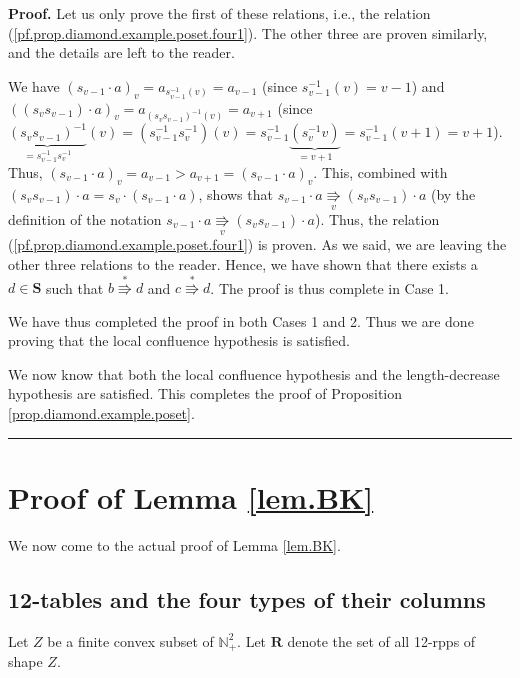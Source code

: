 \documentclass[numbers=enddot,12pt,final,onecolumn,notitlepage]{scrartcl}%
\theoremstyle{definition}
\newenvironment{proof}[1][Proof]{\noindent\textbf{#1.} }{\ \rule{0.5em}{0.5em}}
\begin{document}
\begin{proof}
Let us only prove the first of these relations, i.e., the relation
(\ref{pf.prop.diamond.example.poset.four1}). The other three are proven
similarly, and the details are left to the reader.

We have $\left(  s_{v-1}\cdot a\right)  _{v}=a_{s_{v-1}^{-1}\left(  v\right)
}=a_{v-1}$ (since $s_{v-1}^{-1}\left(  v\right)  =v-1$) and $\left(  \left(
s_{v}s_{v-1}\right)  \cdot a\right)  _{v}=a_{\left(  s_{v}s_{v-1}\right)
^{-1}\left(  v\right)  }=a_{v+1}$ (since $\underbrace{\left(  s_{v}%
s_{v-1}\right)  ^{-1}}_{=s_{v-1}^{-1}s_{v}^{-1}}\left(  v\right)  =\left(
s_{v-1}^{-1}s_{v}^{-1}\right)  \left(  v\right)  =s_{v-1}^{-1}%
\underbrace{\left(  s_{v}^{-1}v\right)  }_{=v+1}=s_{v-1}^{-1}\left(
v+1\right)  =v+1$). Thus, $\left(  s_{v-1}\cdot a\right)  _{v}=a_{v-1}%
>a_{v+1}=\left(  s_{v-1}\cdot a\right)  _{v}$. This, combined with $\left(
s_{v}s_{v-1}\right)  \cdot a=s_{v}\cdot\left(  s_{v-1}\cdot a\right)  $, shows
that $s_{v-1}\cdot a\underset{v}{\Rrightarrow}\left(  s_{v}s_{v-1}\right)
\cdot a$ (by the definition of the notation $s_{v-1}\cdot
a\underset{v}{\Rrightarrow}\left(  s_{v}s_{v-1}\right)  \cdot a$). Thus, the
relation (\ref{pf.prop.diamond.example.poset.four1}) is proven. As we said, we
are leaving the other three relations to the reader. Hence, we have shown that
there exists a $d\in\mathbf{S}$ such that $b\overset{\ast}{\Rrightarrow}d$ and
$c\overset{\ast}{\Rrightarrow}d$. The proof is thus complete in Case 1.

We have thus completed the proof in both Cases 1 and 2. Thus we are done
proving that the local confluence hypothesis is satisfied.

We now know that both the local confluence hypothesis and the length-decrease
hypothesis are satisfied. This completes the proof of Proposition
\ref{prop.diamond.example.poset}.
\end{proof}

\section{\label{sect.proof}Proof of Lemma \ref{lem.BK}}

We now come to the actual proof of Lemma \ref{lem.BK}.

\subsection{\label{subsect.fourtypes}12-tables and the four types of their
columns}

Let $Z$ be a finite convex subset of $\mathbb{N}_{+}^{2}$. Let $\mathbf{R}$
denote the set of all 12-rpps of shape $Z$.
\end{document}
